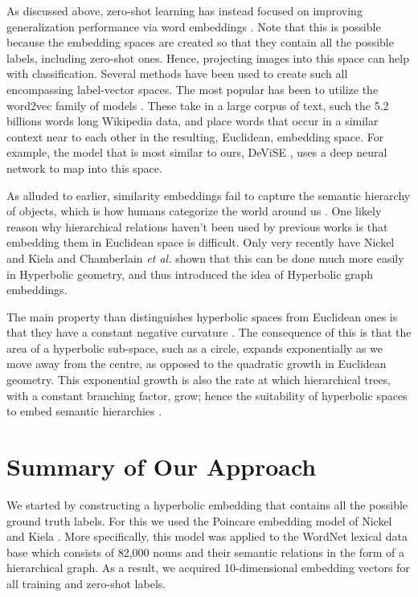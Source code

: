 \documentclass[12pt]{report}
\begin{document}
As discussed above, zero-shot learning has instead focused on improving generalization performance via word embeddings \cite{Palatucci2009, Socher, Huang2012, Frome2013, Norouzi2013}. Note that this is possible because the embedding spaces are created so that they contain all the possible labels, including zero-shot ones. Hence, projecting images into this space can help with classification. Several methods have been used to create such all encompassing label-vector spaces. The most popular has been to utilize the word2vec family of models \cite{Mikolov, Mikolov2013}. These take in a large corpus of text, such the 5.2 billions words long Wikipedia data, and place words that occur in a similar context near to each other in the resulting, Euclidean, embedding space. For example, the model that is most similar to ours, DeViSE \cite{Frome2013}, uses a deep neural network to map into this space. 

As alluded to earlier, similarity embeddings fail to capture the semantic hierarchy of objects, which is how humans categorize the world around us \cite{Rosch1976, Joliceur1984}. One likely reason why hierarchical relations haven't been used by previous works is that embedding them in Euclidean space is difficult. Only very recently have Nickel and Kiela \cite{Nickel2017} and Chamberlain \textit{et al.} \cite{Chamberlain2017} shown that this can be done much more easily in Hyperbolic geometry, and thus introduced the idea of Hyperbolic graph embeddings.

The main property than distinguishes hyperbolic spaces from Euclidean ones is that they have a constant negative curvature \cite{Greenberg1994}. The consequence of this is that the area of a hyperbolic sub-space, such as a circle, expands exponentially as we move away from the centre, as opposed to the quadratic growth in Euclidean geometry. This exponential growth is also the rate at which hierarchical trees, with a constant branching factor, grow; hence the suitability of hyperbolic spaces to embed semantic hierarchies \cite{Nickel2017, Chamberlain2017}.

\section{Summary of Our Approach}
We started by constructing a hyperbolic embedding that contains all the possible ground truth labels. For this we used the Poincare embedding model of Nickel and Kiela \cite{Nickel2017}. More specifically, this model was applied to the WordNet lexical data base which consists of 82,000 nouns and their semantic relations in the form of a hierarchical graph. As a result, we acquired 10-dimensional embedding vectors for all training and zero-shot labels.
\end{document}
